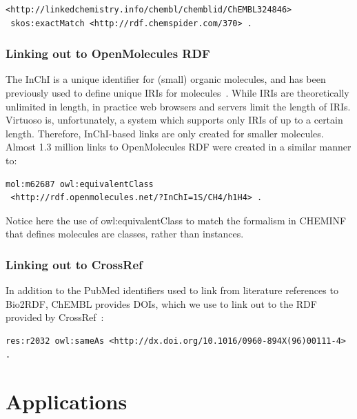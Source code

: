 \documentclass[10pt]{bmc_article}
\newenvironment{bmcformat}{\begin{raggedright}\baselineskip20pt\sloppy\setboolean{publ}{false}}{\end{raggedright}\baselineskip20pt\sloppy}
\begin{document}
\begin{bmcformat}
\begin{small}
\begin{verbatim}
<http://linkedchemistry.info/chembl/chemblid/ChEMBL324846>
 skos:exactMatch <http://rdf.chemspider.com/370> .
\end{verbatim}
\end{small}

\subsubsection*{Linking out to OpenMolecules RDF}

The InChI is a unique identifier for (small) organic molecules, and has been previously used
to define unique IRIs for molecules~\cite{Bradley2009,Willighagen2011}. While IRIs are theoretically unlimited in length,
in practice web browsers and servers limit the length of IRIs. Virtuoso is, unfortunately,
a system which supports only IRIs of up to a certain length. Therefore, InChI-based links are only created for smaller molecules. 
Almost 1.3 million links to OpenMolecules RDF were created in a similar manner to:

\begin{small}
\begin{verbatim}
mol:m62687 owl:equivalentClass
 <http://rdf.openmolecules.net/?InChI=1S/CH4/h1H4> .
\end{verbatim}
\end{small}

Notice here the use of owl:equivalentClass to match the formalism in CHEMINF that defines molecules
are classes, rather than instances.

\subsubsection*{Linking out to CrossRef}

In addition to the PubMed identifiers used to link from literature references to Bio2RDF,
ChEMBL provides DOIs, which we use to link out to the RDF provided by CrossRef~\cite{Bilder2011}:

\begin{small}
\begin{verbatim}
res:r2032 owl:sameAs <http://dx.doi.org/10.1016/0960-894X(96)00111-4> .
\end{verbatim}
\end{small}

\section*{Applications}


\end{bmcformat}
\end{document}
